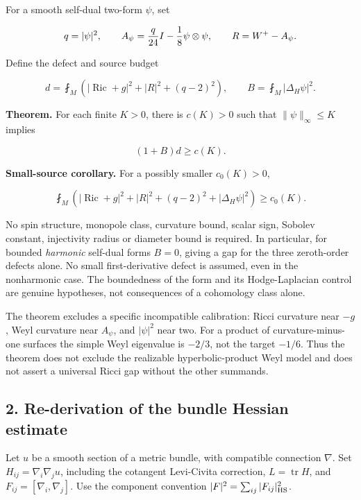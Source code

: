 \documentclass[
  10pt,
]{article}
\begin{document}
For a smooth self-dual two-form \(\psi\), set

\[
 q=|\psi|^2,\qquad
 A_\psi={q\over24}I-{1\over8}\psi\otimes\psi,
 \qquad R=W^+-A_\psi.
\]

Define the defect and source budget

\[
 d=\fint_M\left(|\operatorname{Ric}+g|^2+|R|^2+(q-2)^2\right),
 \qquad B=\fint_M|\Delta_H\psi|^2.
\]

\textbf{Theorem.} For each finite \(K>0\), there is \(c(K)>0\) such that
\(\|\psi\|_\infty\le K\) implies

\[
                    \boxed{(1+B)d\ge c(K).}              \tag{1}
\]

\textbf{Small-source corollary.} For a possibly smaller \(c_0(K)>0\),

\[
 \boxed{\quad
 \fint_M\left(
 |\operatorname{Ric}+g|^2+|R|^2+(q-2)^2+|\Delta_H\psi|^2
 \right)\ge c_0(K).
 \quad}                                                     \tag{1a}
\]

No spin structure, monopole class, curvature bound, scalar sign, Sobolev
constant, injectivity radius or diameter bound is required. In
particular, for bounded \emph{harmonic} self-dual forms \(B=0\), giving
a gap for the three zeroth-order defects alone. No small
first-derivative defect is assumed, even in the nonharmonic case. The
boundedness of the form and its Hodge-Laplacian control are genuine
hypotheses, not consequences of a cohomology class alone.

The theorem excludes a specific incompatible calibration: Ricci
curvature near \(-g\), Weyl curvature near \(A_\psi\), and \(|\psi|^2\)
near two. For a product of curvature-minus-one surfaces the simple Weyl
eigenvalue is \(-2/3\), not the target \(-1/6\). Thus the theorem does
not exclude the realizable hyperbolic-product Weyl model and does not
assert a universal Ricci gap without the other summands.

\hypertarget{re-derivation-of-the-bundle-hessian-estimate}{%
\subsection{2. Re-derivation of the bundle Hessian
estimate}\label{re-derivation-of-the-bundle-hessian-estimate}}

Let \(u\) be a smooth section of a metric bundle, with compatible
connection \(\nabla\). Set \(H_{ij}=\nabla_i\nabla_j u\), including the
cotangent Levi-Civita correction, \(L=\operatorname{tr}H\), and
\(F_{ij}=[\nabla_i,\nabla_j]\). Use the component convention
\(|F|^2=\sum_{ij}|F_{ij}|_{\rm HS}^2\).
\end{document}
